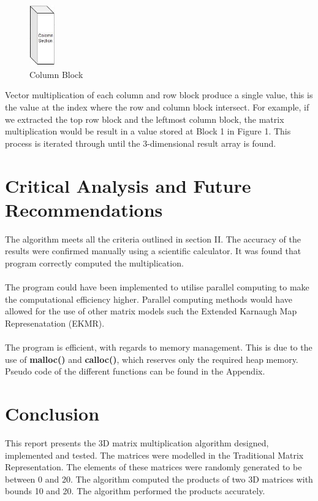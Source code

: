 \documentclass[a4paper, 11pt, onecolumn, conference]{IEEEtran}      %
\begin{document}
\begin{figure}[H]
\centering
\includegraphics[width=0.1\textwidth]{ColomnBlock.JPG}%
\caption{Column Block}
\label{fig:3}
\end{figure}

Vector multiplication of each column and row block produce a single value, this is the value at the index where the row and column block intersect. For example, if we extracted the top row block and the leftmost column block, the matrix multiplication would be result in a value stored at Block 1 in Figure 1. This process is iterated through until the 3-dimensional result array is found.

\section{Critical Analysis and Future Recommendations}
The algorithm meets all the criteria outlined in section II. The accuracy of the results were confirmed manually using a scientific calculator. It was found that program correctly computed the multiplication.\\\\
The program could have been implemented to utilise parallel computing to make the computational efficiency higher. Parallel computing methods would have allowed for the use of other matrix models such the Extended Karnaugh Map Represenatation (EKMR).\\\\
The program is efficient, with regards to memory management. This is due to the use of \textbf{malloc()} and \textbf{calloc()}, which reserves only the required heap memory. \\

Pseudo code of the different functions can be found in the Appendix.

\section{Conclusion}
This report presents the 3D matrix multiplication algorithm designed, implemented and tested. The matrices were modelled in the Traditional Matrix Representation. The elements of these matrices were randomly generated to be between 0 and 20. The algorithm computed the products of two 3D matrices with bounds 10 and 20. The algorithm performed the products accurately. 
\end{document}
